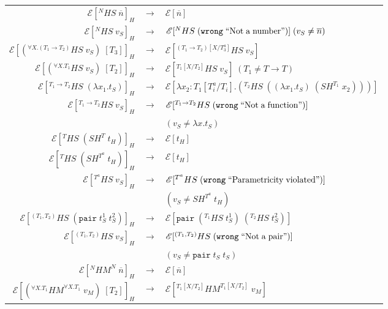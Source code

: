 \begin{figure}
\onehalfspacing
\begin{center}
\begin{tabular}{rcl}
$\mathscr{E}[^{N}HS\;\overline{n}]_{H}$ & $\rightarrow$ & $\mathscr{E}[\overline{n}]$ \\
$\mathscr{E}[^{N}HS\;v_{S}]_{H}$ & $\rightarrow$ & $\mathscr{E}[^{N}HS\;(\mathtt{wrong}\;\mathrm{``Not\;a\;number"})]\;(v_{S}\neq\overline{n})$ \\
$\mathscr{E}[(^{\forall X.(T_{1}\rightarrow T_{2})}HS\;v_{S})\;[T_{3}]]_{H}$ & $\rightarrow$ & $\mathscr{E}[^{(T_{1}\rightarrow T_{2})[X/T^{a}_{3}]}HS\;v_{S}]$ \\
$\mathscr{E}[(^{\forall X.T_{1}}HS\;v_{S})\;[T_{2}]]_{H}$ & $\rightarrow$ & $\mathscr{E}[^{T_{1}[X/T_{2}]}HS\;v_{S}]\;(T_{1}\neq T\rightarrow T)$ \\
$\mathscr{E}[^{T_{1}\rightarrow T_{2}}HS\;(\lambda x_{1}.t_{S})]_{H}$ & $\rightarrow$ & $\mathscr{E}[\lambda x_{2}:T_{1}[T^{a}_{i}/T_{i}].(^{T_{2}}HS\;((\lambda x_{1}.t_{S})\;(SH^{T_{1}}\;x_{2})))]$ \\
$\mathscr{E}[^{T_{1}\rightarrow T_{2}}HS\;v_{S}]_{H}$ & $\rightarrow$ & $\mathscr{E}[^{T_{1}\rightarrow T_{2}}HS\;(\mathtt{wrong}\;\mathrm{``Not\;a\;function"})]$ \\
&& $(v_{S}\neq\lambda x.t_{S})$ \\
$\mathscr{E}[^{T}HS\;(SH^{T}\;t_{H})]_{H}$ & $\rightarrow$ & $\mathscr{E}[t_{H}]$ \\
$\mathscr{E}[^{T}HS\;(SH^{T^{a}}\;t_{H})]_{H}$ & $\rightarrow$ & $\mathscr{E}[t_{H}]$ \\
$\mathscr{E}[^{T^{a}}HS\;v_{S}]_{H}$ & $\rightarrow$ & $\mathscr{E}[^{T^{a}}HS\;(\mathtt{wrong}\;\mathrm{``Parametricity\;violated"})]$ \\
&& $(v_{S}\neq SH^{T^{a}}\;t_{H})$ \\
$\mathscr{E}[^{(T_{1},T_{2})}HS\;(\mathtt{pair}\;t_{S}^{1}\;t_{S}^{2})]_{H}$ & $\rightarrow$ & $\mathscr{E}[\mathtt{pair}\;(^{T_{1}}HS\;t_{S}^{1})\;(^{T_{2}}HS\;t_{S}^{2})]$ \\
$\mathscr{E}[^{(T_{1},T_{2})}HS\;v_{S}]_{H}$ & $\rightarrow$ & $\mathscr{E}[^{(T_{1},T_{2})}HS\;(\mathtt{wrong}\;\mathrm{``Not\;a\;pair"})]$ \\
&& $(v_{S}\neq\mathtt{pair}\;t_{S}\;t_{S})$ \\
$\mathscr{E}[^{N}HM^{N}\;\overline{n}]_{H}$ & $\rightarrow$ & $\mathscr{E}[\overline{n}]$ \\
$\mathscr{E}[(^{\forall X.T_{1}}HM^{\forall X.T_{1}}\;v_{M})\;[T_{2}]]_{H}$ & $\rightarrow$ & $\mathscr{E}[^{T_{1}[X/T_{2}]}HM^{T_{1}[X/T_{2}]}\;v_{M}]$ \\

\end{tabular}
\end{center}
\end{figure}

